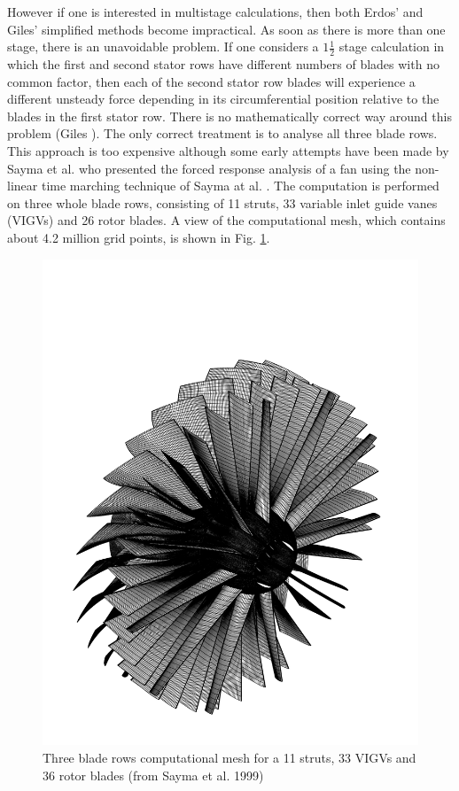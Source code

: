 However if one is interested in multistage calculations, then both
 Erdos' and Giles' simplified methods become impractical.
 As soon as there is more than one stage, there is an unavoidable problem.
 If one considers a $1\frac{1}{2}$ stage calculation in which the first and
 second stator rows have different numbers of blades with no common factor,
 then each of the second stator row blades will experience a different unsteady
 force depending in its circumferential position relative to the blades in the
 first stator row.
 There is no mathematically correct way around this problem
 (Giles ).
 The only correct treatment is to analyse all three blade rows.
 This approach is too expensive although some early attempts have
 been made by Sayma et al. \citeyear{Mehdi:6} who
 presented the forced response analysis of a fan using the non-linear
 time marching technique of Sayma at al. \citeyear{Luca:10}. The computation
 is performed on three whole blade rows, consisting of 11 struts, 33 variable inlet
 guide vanes (VIGVs) and 26 rotor blades.
 A view of the computational mesh, which contains about 4.2 million grid points,
 is shown in Fig. \ref{threerows.fig}.
%
\begin{figure}[ht]
  \centerline{\includegraphics[width=120mm,clip=t]{CHAP_INTRO/FIGURE/threerows.pdf}}
  \caption{Three blade rows computational mesh for a 11 struts, 33 VIGVs and
           36 rotor blades (from Sayma et al. 1999)}
  \label{threerows.fig}
\end{figure}
%
